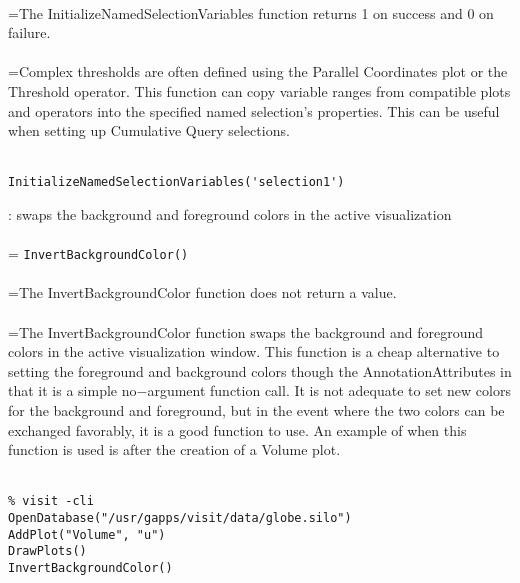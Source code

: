 \documentclass[10pt,a4paper]{report}
\begin{document}
 \\ 
\hangindent=\parindent The InitializeNamedSelectionVariables function returns 1 on success and 0 on failure. \\[-3mm] 

 \\ 
\hangindent=\parindent Complex thresholds are often defined using the Parallel Coordinates plot or the Threshold operator. This function can copy variable ranges from compatible plots and operators into the specified named selection's properties. This can be useful when setting up Cumulative Query selections. \\[-3mm] 

\\[-6mm]
\begin{verbatim}InitializeNamedSelectionVariables('selection1')
\end{verbatim}
\newpage


{}
: swaps the background and foreground colors in the active visualization\\[-3mm]

 \\ 
\hangindent=\parindent 
\verb!InvertBackgroundColor()!\\ [-3mm]

 \\ 
\hangindent=\parindent The InvertBackgroundColor function does not return a value. \\[-3mm] 

 \\ 
\hangindent=\parindent The InvertBackgroundColor function swaps the background and foreground colors in the active visualization window. This function is a cheap alternative to setting the foreground and background colors though the AnnotationAttributes in that it is a simple no$-$argument function call. It is not adequate to set new colors for the background and foreground, but in the event where the two colors can be exchanged favorably, it is a good function to use. An example of when this function is used is after the creation of a Volume plot. \\[-3mm] 

\\[-6mm]
\begin{verbatim}% visit -cli
OpenDatabase("/usr/gapps/visit/data/globe.silo")
AddPlot("Volume", "u")
DrawPlots()
InvertBackgroundColor()
\end{verbatim}
\newpage
\end{document}

